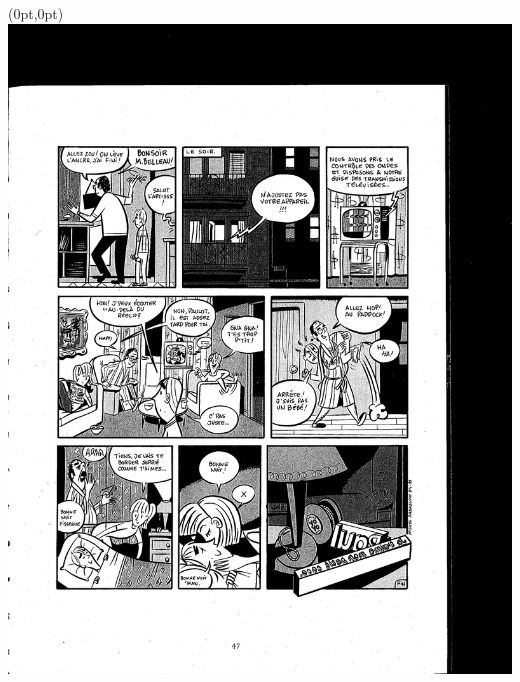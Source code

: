\begin{textblock*}{440pt}(0pt,0pt)
  \includegraphics[angle=180]{paul-apprenti-typographe/paul-page_4}
\end{textblock*}
\null\clearpage
\endgroup

